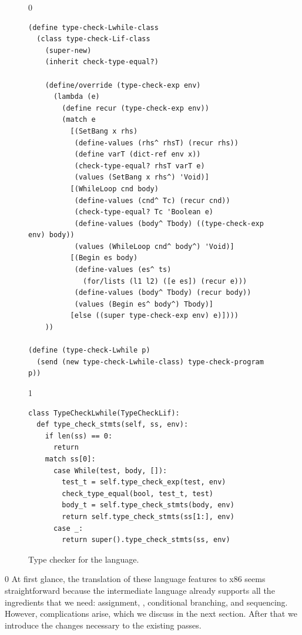 \documentclass[7x10]{TimesAPriori_MIT}%
\def\racketEd{0}
\def\pythonEd{1}
\def\edition{1}
\newcommand{\pythonColor}[0]{}
\numberwithin{theorem}{chapter}
\numberwithin{definition}{chapter}
\numberwithin{equation}{chapter}
\begin{document}
\begin{figure}[tbp]
\begin{tcolorbox}[colback=white]  
{\if\edition\racketEd    
\begin{lstlisting}[basicstyle=\ttfamily\footnotesize]
(define type-check-Lwhile-class
  (class type-check-Lif-class
    (super-new)
    (inherit check-type-equal?)

    (define/override (type-check-exp env)
      (lambda (e)
        (define recur (type-check-exp env))
        (match e
          [(SetBang x rhs)
           (define-values (rhs^ rhsT) (recur rhs))
           (define varT (dict-ref env x))
           (check-type-equal? rhsT varT e)
           (values (SetBang x rhs^) 'Void)]
          [(WhileLoop cnd body)
           (define-values (cnd^ Tc) (recur cnd))
           (check-type-equal? Tc 'Boolean e)
           (define-values (body^ Tbody) ((type-check-exp env) body))
           (values (WhileLoop cnd^ body^) 'Void)]
          [(Begin es body)
           (define-values (es^ ts)
             (for/lists (l1 l2) ([e es]) (recur e)))
           (define-values (body^ Tbody) (recur body))
           (values (Begin es^ body^) Tbody)]
          [else ((super type-check-exp env) e)])))
    ))

(define (type-check-Lwhile p)
  (send (new type-check-Lwhile-class) type-check-program p))
\end{lstlisting}
\fi}
{\if\edition\pythonEd\pythonColor
\begin{lstlisting}
class TypeCheckLwhile(TypeCheckLif):
  def type_check_stmts(self, ss, env):
    if len(ss) == 0:
      return
    match ss[0]:
      case While(test, body, []):
        test_t = self.type_check_exp(test, env)
        check_type_equal(bool, test_t, test)
        body_t = self.type_check_stmts(body, env)
        return self.type_check_stmts(ss[1:], env)
      case _:
        return super().type_check_stmts(ss, env)
\end{lstlisting}
\fi}
\end{tcolorbox}

\caption{Type checker for the \LangLoop{} language.}
\label{fig:type-check-Lwhile}
\end{figure}


{\if\edition\racketEd    
%  
At first glance, the translation of these language features to x86
seems straightforward because the \LangCIf{} intermediate language
already supports all the ingredients that we need: assignment,
, conditional branching, and sequencing. However, 
complications arise, which we discuss in the next section. After
that we introduce the changes necessary to the existing passes.
%
\fi}
\end{document}
